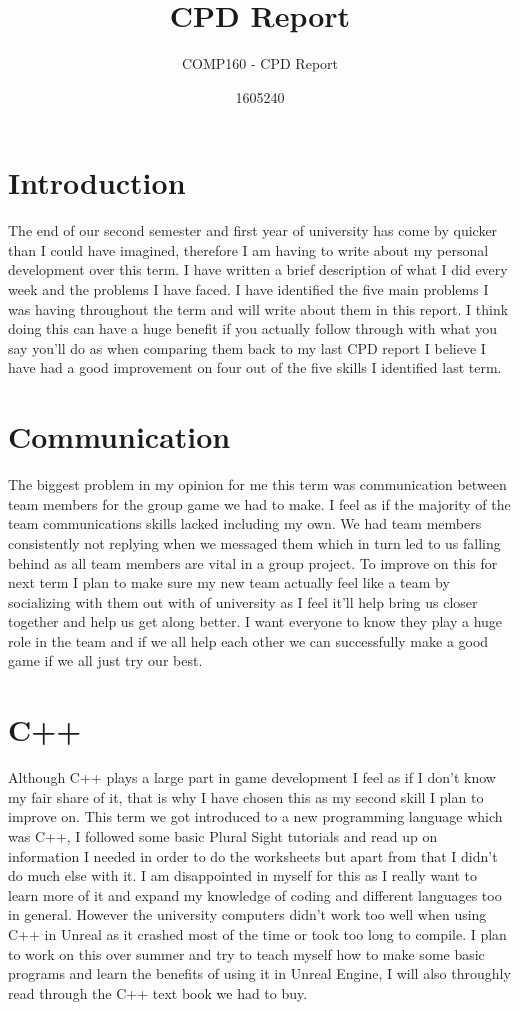 \documentclass{scrartcl}
\title{CPD Report}
\subtitle{COMP160 - CPD Report}
\author{1605240}
\begin{document}
\maketitle

\section*{Introduction}
The end of our second semester and first year of university has come by quicker than I could have imagined, therefore I am having to write about my personal development over this term. I have written a brief description of what I did every week and the problems I have faced. I have identified the five main problems I was having throughout the term and will write about them in this report. I think doing this can have a huge benefit if you actually follow through with what you say you'll do as when comparing them back to my last CPD report I believe I have had a good improvement on four out of the five skills I identified last term.

\section{Communication}
The biggest problem in my opinion for me this term was communication between team members for the group game we had to make. I feel as if the majority of the team communications skills lacked including my own. We had team members consistently not replying when we messaged them which in turn led to us falling behind as all team members are vital in a group project. To improve on this for next term I plan to make sure my new team actually feel like a team by socializing with them out with of university as I feel it'll help bring us closer together and help us get along better. I want everyone to know they play a huge role in the team and if we all help each other we can successfully make a good game if we all just try our best.


\section{C++}
Although C++ plays a large part in game development I feel as if I don't know my fair share of it, that is why I have chosen this as my second skill I plan to improve on. This term we got introduced to a new programming language which was C++, I followed some basic Plural Sight tutorials and read up on information I needed in order to do the worksheets but apart from that I didn't do much else with it. I am disappointed in myself for this as I really want to learn more of it and expand my knowledge of coding and different languages too in general. However the university computers didn't work too well when using C++ in Unreal as it crashed most of the time or took too long to compile. I plan to work on this over summer and try to teach myself how to make some basic programs and learn the benefits of using it in Unreal Engine, I will also throughly read through the C++ text book we had to buy.
\end{document}

